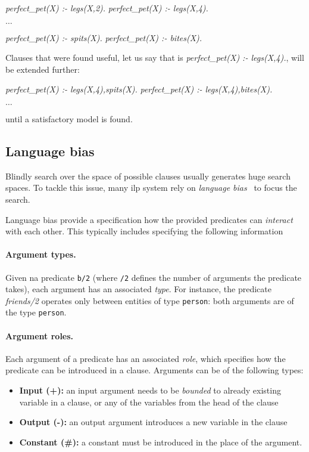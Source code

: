 \begin{center}
	\textit{perfect\_pet(X) :- legs(X,2).} \quad \textit{perfect\_pet(X) :- legs(X,4).}

	$\ldots$

	\textit{perfect\_pet(X) :- spits(X).} \quad \textit{perfect\_pet(X) :- bites(X).}
\end{center}


Clauses that were found useful, let us say that is \textit{perfect\_pet(X) :- legs(X,4).}, will be extended further:


\begin{center}
	\textit{perfect\_pet(X) :- legs(X,4),spits(X).} \quad \textit{perfect\_pet(X) :- legs(X,4),bites(X).}

	$\ldots$
\end{center}

until a satisfactory model is found.







\subsection{Language bias}
\label{ch2:languagebias}

Blindly search over the space of possible clauses usually generates huge search spaces.
To tackle this issue, many \gls{ilp} system rely on \textit{language bias}~\cite{DBLP:reference/ml/Blockeel17} to focus the search.


Language bias provide a specification how the provided predicates can \textit{interact} with each other.
This typically includes specifying the following information


\paragraph{Argument types.} Given na predicate \texttt{b/2} (where \texttt{/2} defines the number of arguments the predicate takes), each argument has an associated \textit{type}. For instance, the predicate \textit{friends/2} operates only between entities of type \texttt{person}: both arguments are of the type \texttt{person}.


\paragraph{Argument roles.} Each argument of a predicate has an associated \textit{role}, which specifies how the predicate can be introduced in a clause.
Arguments can be of the following types:
\begin{itemize}
	\item \textbf{Input (+):} an input argument needs to be \textit{bounded} to already existing variable in a clause, or any of the variables from the head of the clause
	\item \textbf{Output (-):} an output argument introduces a new variable in the clause
	\item \textbf{Constant (\#):} a constant must be introduced in the place of the argument.
\end{itemize}

